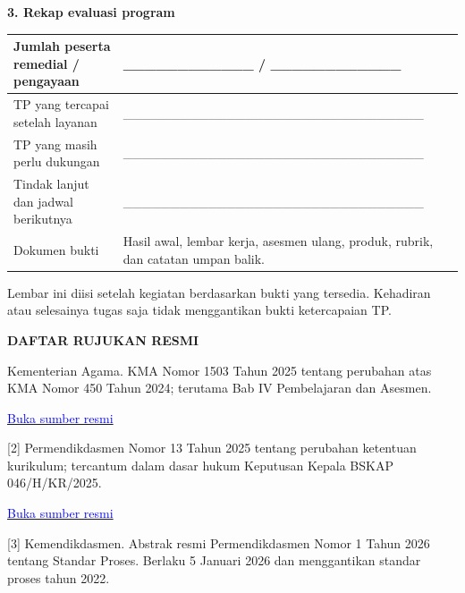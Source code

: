 \documentclass[11pt,a4paper]{article}
\begin{document}
\par\medskip\noindent\textbf{3. Rekap evaluasi program}\par\smallskip
{\small\setlength{\tabcolsep}{2mm}\renewcommand{\arraystretch}{1.35}\begin{longtable}{|>{\raggedright\arraybackslash}p{77.826mm}|>{\raggedright\arraybackslash}p{91.724mm}|}\hline
Jumlah peserta remedial / pengayaan & \_\_\_\_\_\_\_\_\_\_\_\_ / \_\_\_\_\_\_\_\_\_\_\_\_\\ \hline
TP yang tercapai setelah layanan & \_\_\_\_\_\_\_\_\_\_\_\_\_\_\_\_\_\_\_\_\_\_\_\_\_\_\_\_\_\_\_\_\\ \hline
TP yang masih perlu dukungan & \_\_\_\_\_\_\_\_\_\_\_\_\_\_\_\_\_\_\_\_\_\_\_\_\_\_\_\_\_\_\_\_\\ \hline
Tindak lanjut dan jadwal berikutnya & \_\_\_\_\_\_\_\_\_\_\_\_\_\_\_\_\_\_\_\_\_\_\_\_\_\_\_\_\_\_\_\_\\ \hline
Dokumen bukti & Hasil awal, lembar kerja, asesmen ulang, produk, rubrik, dan catatan umpan balik.\\ \hline
\end{longtable}}\medskip
{\small Lembar ini diisi setelah kegiatan berdasarkan bukti yang tersedia. Kehadiran atau selesainya tugas saja tidak menggantikan bukti ketercapaian TP.\par}\medskip
\clearpage
\begin{center}\bfseries\large DAFTAR RUJUKAN RESMI\end{center}\medskip
[1] Kementerian Agama. KMA Nomor 1503 Tahun 2025 tentang perubahan atas KMA Nomor 450 Tahun 2024; terutama Bab IV Pembelajaran dan Asesmen.\par\medskip
\href{https://sulteng.kemenag.go.id/files/show/20251020162801surat-penyampaian-kma-kurikulum-2025%2Blampiran_compressed-tzR.pdf}{\small\textcolor{blue}{Buka sumber resmi}}\par
\vspace{8.50393701pt}
[2] Permendikdasmen Nomor 13 Tahun 2025 tentang perubahan ketentuan kurikulum; tercantum dalam dasar hukum Keputusan Kepala BSKAP 046/H/KR/2025.\par\medskip
\href{https://bpmpbabel.kemendikdasmen.go.id/PPID/wp-content/uploads/2025/07/KepKaBSKAP-046_2025-ttg-CP.pdf}{\small\textcolor{blue}{Buka sumber resmi}}\par
\vspace{8.50393701pt}
[3] Kemendikdasmen. Abstrak resmi Permendikdasmen Nomor 1 Tahun 2026 tentang Standar Proses. Berlaku 5 Januari 2026 dan menggantikan standar proses tahun 2022.\par\medskip
\end{document}
